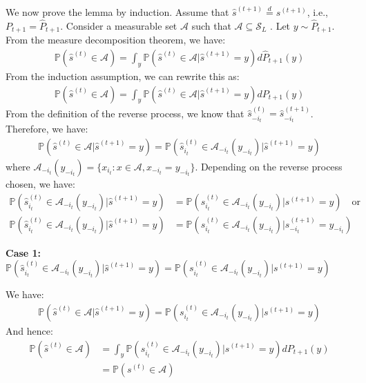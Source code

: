 We now prove the lemma by induction. Assume that $\hat{s}^{(t+1)} \overset{d}{=} {s}^{(t+1)} $, i.e., ${P}_{t+1} = \hat{P}_{t+1}$. Consider a measurable set $\mathcal{A}$ such that $\mathcal{A} \subseteq \mathcal{S}_L$ . Let $y \sim \hat{P}_{t+1}$. From the measure decomposition theorem, we have:
\begin{align*}
    \mathbb{P}(\hat{s}^{(t)} \in \mathcal{A}) = \int_{y} \mathbb{P}\left(\hat{s}^{(t)} \in \mathcal{A}|\hat{s}^{(t+1)} = y \right) d\hat{P}_{t+1}(y)
\end{align*}
From the induction assumption, we can rewrite this as:
\begin{align*}
    \mathbb{P}(\hat{s}^{(t)} \in \mathcal{A}) = \int_{y} \mathbb{P}\left(\hat{s}^{(t)} \in \mathcal{A}| \hat{s}^{(t+1)} = y \right) d{P}_{t+1}(y)
\end{align*}
From the definition of the reverse process, we know that $\hat{s}^{(t)}_{-i_t} = \hat{s}^{(t+1)}_{-i_t} $. Therefore, we have:
\begin{align*}
     \mathbb{P}\left(\hat{s}^{(t)} \in \mathcal{A}|\hat{s}^{(t+1)} = y \right) =  \mathbb{P}\left(\hat{s}^{(t)}_{i_t} \in \mathcal{A}_{-i_t}\left(y_{-i_t} \right)| \hat{s}^{(t+1)} = y \right) 
\end{align*}
where $\mathcal{A}_{-i_t}\left(y_{-i_t} \right) = \{x_{i_t}: x \in \mathcal{A}, x_{-i_t} = y_{-i_t} \}$. Depending on the reverse process chosen, we have:
\begin{align*}
    \mathbb{P}\left(\hat{s}^{(t)}_{i_t} \in \mathcal{A}_{-i_t}\left(y_{-i_t} \right)|\hat{s}^{(t+1)} =  y \right) &= \mathbb{P}\left({s}^{(t)}_{i_t} \in \mathcal{A}_{-i_t}\left(y_{-i_t} \right)|s^{(t+1)} = y \right) \quad \text{or} \\
    \mathbb{P}\left(\hat{s}^{(t)}_{i_t} \in \mathcal{A}_{-i_t}\left(y_{-i_t} \right)|\hat{s}^{(t+1)} =  y \right) &= \mathbb{P}\left({s}^{(t)}_{i_t} \in \mathcal{A}_{-i_t}\left(y_{-i_t} \right)|s^{(t+1)}_{-i_t} = y_{-i_t} \right)
\end{align*}

\textbf{Case 1:} $ \mathbb{P}\left(\hat{s}^{(t)}_{i_t} \in \mathcal{A}_{-i_t}\left(y_{-i_t} \right)|\hat{s}^{(t+1)} =  y \right) = \mathbb{P}\left({s}^{(t)}_{i_t} \in \mathcal{A}_{-i_t}\left(y_{-i_t} \right)|s^{(t+1)} = y \right)  $

We have:
\begin{align*}
    \mathbb{P}\left(\hat{s}^{(t)} \in \mathcal{A}|\hat{s}^{(t+1)} = y \right) =  \mathbb{P}\left({s}^{(t)}_{i_t} \in \mathcal{A}_{-i_t}\left(y_{-i_t} \right)|s^{(t+1)} = y \right)
\end{align*}
And hence:
\begin{align*}
    \mathbb{P}(\hat{s}^{(t)} \in \mathcal{A}) &= \int_y  \mathbb{P}\left({s}^{(t)}_{i_t} \in \mathcal{A}_{-i_t}\left(y_{-i_t} \right)|s^{(t+1)} = y \right) d{P}_{t+1}(y) \\
    &= \mathbb{P}({s}^{(t)} \in \mathcal{A})
\end{align*}

